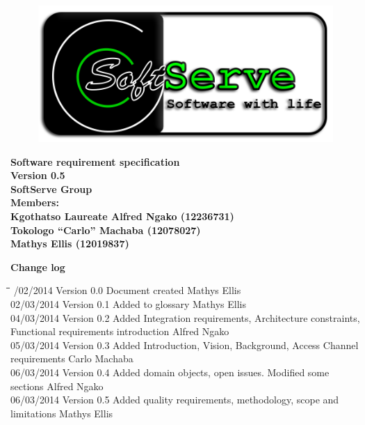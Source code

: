 \documentclass[12pt]{article}
\newcommand{\Title}{Software requirement specification} %
\begin{document}
	\vspace{4em}
	
	\begin{center}%
	
		\begin{figure}[ht!]
			\centering
			\includegraphics{./Pictures/logo.png}
	 	\end{figure}
		\LARGE \bf \Title \\
		{\bf Version 0.5}\\[4em]
	  	\LARGE {\bf SoftServe Group }\\[1em]
	  	\LARGE {\bf Members:}\\[2em]
	  	\large
	     Kgothatso Laureate Alfred Ngako	(12236731) \\[1em]
	     Tokologo “Carlo” Machaba			(12078027) \\[1em]
	     Mathys Ellis						(12019837) \\[8em]
	    
	\end{center}%
	
	\newpage
		{\LARGE \bf Change log}\\[2em]
		
		\begin{tabbing}
			\hspace*{2.5cm}\=\hspace*{2.5cm}\=\hspace*{8cm}\=\hspace*{3cm} /02/2014 \> Version 0.0 \> Document created \> Mathys Ellis \\
			02/03/2014 \> Version 0.1 \> Added to glossary \> Mathys Ellis \\
			04/03/2014 \> Version 0.2 \> Added Integration requirements, Architecture constraints, Functional requirements introduction   \> Alfred Ngako \\
			05/03/2014 \> Version 0.3 \> Added Introduction, Vision, Background, Access Channel requirements \> Carlo Machaba \\
			06/03/2014 \> Version 0.4 \> Added domain objects, open issues. Modified some sections  \> Alfred Ngako \\
			06/03/2014 \> Version 0.5 \> Added quality requirements, methodology, scope and limitations  \> Mathys Ellis \\
			
		\end{tabbing}
	
\end{document}
